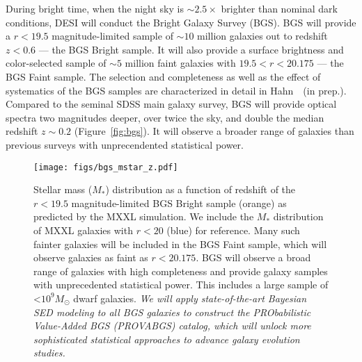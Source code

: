 During bright time, when the night sky is ${\sim}2.5\times$ brighter than
nominal dark conditions, DESI will conduct the Bright Galaxy Survey (BGS).
BGS will provide a $r < 19.5$ magnitude-limited sample of ${\sim}10$ million
galaxies out to redshift $z < 0.6$ --- the BGS Bright sample. 
It will also provide a surface brightness and color-selected sample of 
${\sim}5$ million faint galaxies with $19.5 < r < 20.175$ --- the BGS Faint
sample. 
The selection and completeness as well as the effect of systematics of the BGS
samples are characterized in detail in Hahn~\etal~(in prep.). 
Compared to the seminal SDSS main galaxy survey, BGS will provide optical
spectra two magnitudes deeper, over twice the sky, and double the median
redshift $z{\sim}0.2$ (Figure~\ref{fig:bgs}). 
It will observe a broader range of galaxies than previous surveys with
unprecendented statistical power. 

\begin{figure}
\begin{center}
    \texttt{[image: figs/bgs\_mstar\_z.pdf]}
    \caption{
        Stellar mass ($M_*$) distribution as a function of redshift of the 
        $r < 19.5$ magnitude-limited BGS Bright sample (orange) as predicted by
        the MXXL simulation. 
        We include the $M_*$ distribution of MXXL galaxies with $r < 20$ (blue)
        for reference.
        Many such fainter galaxies will be included in the BGS Faint sample,
        which will observe galaxies as faint as $r < 20.175$. 
        BGS will observe a broad range of galaxies with high completeness and
        provide galaxy samples with unprecedented statistical power.
        This includes a large sample of <$10^9M_\odot$ dwarf galaxies. %
        \emph{We will apply state-of-the-art Bayesian SED modeling to all BGS
        galaxies to construct the PRObabilistic Value-Added BGS (PROVABGS)
        catalog, which will unlock more sophisticated statistical approaches to
        advance galaxy evolution studies.}}\label{fig:bgs_mstar}
\end{center}
\end{figure}


